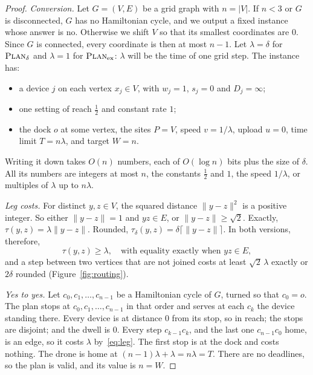 \begin{proof}
\emph{Conversion.} Let $G=(V,E)$ be a grid graph with $n=|V|$. If $n<3$ or
$G$ is disconnected, $G$ has no Hamiltonian cycle, and we output a fixed
instance whose answer is no. Otherwise we shift $V$ so that its smallest
coordinates are $0$. Since $G$ is connected, every coordinate is then at
most $n-1$. Let $\lambda=\delta$ for $\textsc{Plan}_\delta$ and $\lambda=1$ for
$\textsc{Plan}_{\mathrm{ex}}$: $\lambda$ will be the time of one grid step. The
instance has:
\begin{itemize}
  \item a device $j$ on each vertex $x_j\in V$, with $w_j=1$, $s_j=0$ and
    $D_j=\infty$;
  \item one setting of reach $\tfrac12$ and constant rate $1$;
  \item the dock $o$ at some vertex, the sites $P=V$, speed $v=1/\lambda$,
    upload $u=0$, time limit $T=n\lambda$, and target $W=n$.
\end{itemize}
Writing it down takes $O(n)$ numbers, each of $O(\log n)$ bits plus the
size of $\delta$. All its numbers are integers at most $n$, the constants
$\tfrac12$ and $1$, the speed $1/\lambda$, or multiples of $\lambda$ up to
$n\lambda$.

\emph{Leg costs.} For distinct $y,z\in V$, the squared distance
$\lVert y-z\rVert^2$ is a positive integer. So either $\lVert y-z\rVert=1$
and $yz\in E$, or $\lVert y-z\rVert\ge\sqrt2$. Exactly,
$\tau(y,z)=\lambda\lVert y-z\rVert$. Rounded,
$\tau_\delta(y,z)=\delta\lceil\lVert y-z\rVert\rceil$. In both versions,
therefore,
\begin{equation}
  \tau(y,z)\ge\lambda,\quad\text{with equality exactly when } yz\in E,
  \label{eq:leg}
\end{equation}
and a step between two vertices that are not joined costs at least
$\sqrt2\,\lambda$ exactly or $2\delta$ rounded (Figure~\ref{fig:routing}).

\emph{Yes to yes.} Let $c_0,c_1,\dots,c_{n-1}$ be a Hamiltonian cycle of
$G$, turned so that $c_0=o$. The plan stops at $c_0,c_1,\dots,c_{n-1}$ in
that order and serves at each $c_k$ the device standing there. Every device
is at distance $0$ from its stop, so in reach; the stops are disjoint; and
the dwell is $0$. Every step $c_{k-1}c_k$, and the last one $c_{n-1}c_0$
home, is an edge, so it costs $\lambda$ by~\eqref{eq:leg}. The first stop
is at the dock and costs nothing. The drone is home at
$(n-1)\lambda+\lambda=n\lambda=T$. There are no deadlines, so the plan is
valid, and its value is $n=W$.


\end{proof}
